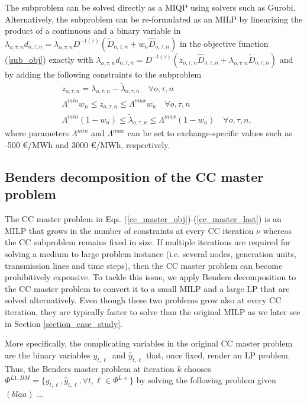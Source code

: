 \documentclass[final]{IEEEtran}
\begin{document}
The subproblem can be solved directly as a MIQP using solvers such as Gurobi. Alternatively, the subproblem can be re-formulated as an MILP by linearizing the product of a continuous and a binary variable in $\lambda_{o, \tau, n} d_{o, \tau, n} = \lambda_{o, \tau, n} D^{-t(\tau)} (\tilde{D}_{o, \tau, n} + w_n \hat{D}_{o, \tau, n})$ in the objective function (\ref{sub_obj}) exactly with $\lambda_{o, \tau, n} d_{o, \tau, n} = D^{-t(\tau)} (z_{o, \tau, n} \hat{D}_{o, \tau, n} + \lambda_{o, \tau, n} \tilde{D}_{o, \tau, n})$ and by adding the following constraints to the subproblem
\begin{align}
&\label{z_constr} z_{o, \tau, n} = \lambda_{o, \tau, n} - \tilde{\lambda}_{o, \tau, n} \quad \forall o, \tau, n \\
&\Lambda^{min} w_n \leq z_{o, \tau, n} \leq \Lambda^{max} w_n \quad \forall o, \tau, n \\
&\Lambda^{min} (1 - w_n) \leq \tilde{\lambda}_{o, \tau, n} \leq \Lambda^{max} (1 - w_n) \quad \forall o, \tau, n,
\end{align}
where parameters $\Lambda^{min}$ and $\Lambda^{max}$ can be set to exchange-specific values such as -500 €/MWh and 3000 €/MWh, respectively.

\subsection{Benders decomposition of the CC master problem}

The CC master problem in Eqs. (\ref{cc_master_obj})-(\ref{cc_master_last}) is an MILP that grows in the number of constraints at every CC iteration $\nu$ whereas the CC subproblem remains fixed in size. If multiple iterations are required for solving a medium to large problem instance (i.e. several nodes, generation units, transmission lines and time steps), then the CC master problem can become prohibitively expensive. To tackle this issue, we apply Benders decomposition to the CC master problem to convert it to a small MILP and a large LP that are solved alternatively. Even though these two problems grow also at every CC iteration, they are typically faster to solve than the original MILP as we later see in Section \ref{section_case_study}.

More specifically, the complicating variables in the original CC master problem are the binary variables $y_{t, \ell}$ and $\hat{y}_{t, \ell}$ that, once fixed, render an LP problem. Thus, the Benders master problem at iteration $k$ chooses $\Phi^{L1, BM} = \{ y_{t, \ell}, \hat{y}_{t, \ell}, \forall t, \ell \in \Psi^{L+} \}$ by solving the following problem given $(blaa)$ ...
\end{document}
